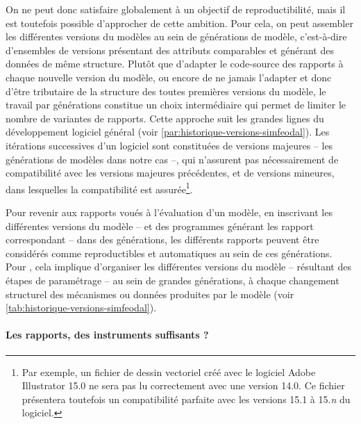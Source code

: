 On ne peut donc satisfaire globalement à un objectif de reproductibilité, mais il est toutefois possible d'approcher de cette ambition.
Pour cela, on peut assembler les différentes versions du modèles au sein de \og générations\fg{} de modèle, c'est-à-dire d'ensembles de versions présentant des attributs comparables et générant des données de même structure.
Plutôt que d'adapter le code-source des rapports à chaque nouvelle version du modèle, ou encore de ne jamais l'adapter et donc d'être tributaire de la structure des toutes premières versions du modèle, le travail par générations constitue un choix intermédiaire qui permet de limiter le nombre de variantes de rapports.
Cette approche suit les grandes lignes du développement logiciel général (voir \cref{par:historique-versions-simfeodal}).
Les itérations successives d'un logiciel sont constituées de versions majeures -- les générations de modèles dans notre cas --, qui n'assurent pas nécessairement de compatibilité avec les versions majeures précédentes, et de versions mineures, dans lesquelles la compatibilité est assurée\footnote{
	Par exemple, un fichier de dessin vectoriel créé avec le logiciel Adobe Illustrator 15.0 ne sera pas lu correctement avec une version 14.0.
	Ce fichier présentera toutefois un compatibilité parfaite avec les versions 15.1 à 15.\textit{n} du logiciel.
}.

Pour revenir aux rapports voués à l'évaluation d'un modèle, en inscrivant les différentes versions du modèle -- et des programmes générant les rapport correspondant -- dans des générations, les différents rapports peuvent être considérés comme reproductibles et automatiques au sein de ces générations.
Pour \simfeodal{}, cela implique d'organiser les différentes versions du modèle -- résultant des étapes de paramétrage -- au sein de grandes générations, à chaque changement structurel des mécanismes ou données produites par le modèle (voir \cref{tab:historique-versions-simfeodal}).


\paragraph{Les rapports, des instruments suffisants ?}

